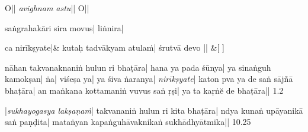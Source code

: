 \documentclass[11pt,twoside]{book}
\begin{document}
\beginnumbering
\pstart
\skipnumbering
\centering{||} O{||} \textit{avighnam astu}{||} O{||}\pend

\pstart\noindent{} saṅgrahakāri sira movus{|} liṅnira{|} \pend

\stanza
 \hidenumbering {}  ca  nirīkṣyate{|}&
\hidenumbering kutaḥ tadvākyam atulaṁ{|} śrutvā devo  {||} \&[ ]

\pstart nāhan takvanaknaniṅ hulun ri bhaṭāra{|} hana ya pada śūnya{|} ya sinaṅguh ka\-mo\-kṣan{|} ṅa{|} viśeṣa ya{|} ya śiva ṅaranya{|} \textit{nirīkṣyate}{|} katon pva ya de saṅ  sājñā bhaṭāra{|} an maṅkana kottamaniṅ vuvus saṅ ṛṣi{|} ya ta kaṛṅĕ de bhaṭāra{||} 1.2\pend

\pstart\textit{}{|}\textit{sukhayogasya lakṣaṇaṁ}{|}  takvananiṅ hulun ri kita bha\-ṭā\-ra{|} ndya kunaṅ upāyanikā saṅ paṇḍita{|} mataṅyan kapaṅguhāvaknikaṅ sukhādhyātmika{||} 10.25\pend

\endnumbering
\end{document}
